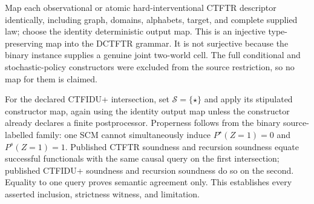 Map each observational or atomic hard-interventional CTFTR descriptor identically, including graph, domains, alphabets, target, and complete supplied law; choose the identity deterministic output map.  This is an injective type-preserving map into the DCTFTR grammar.  It is not surjective because the binary instance supplies a genuine joint two-world cell.  The full conditional and stochastic-policy constructors were excluded from the source restriction, so no map for them is claimed.

For the declared CTFIDU+ intersection, set \(\mathcal S=\{\star\}\) and apply its stipulated constructor map, again using the identity output map unless the constructor already declares a finite postprocessor.  Properness follows from the binary source-labelled family: one SCM cannot simultaneously induce \(P^\star(Z=1)=0\) and \(P^s(Z=1)=1\).  Published CTFTR soundness and recursion soundness equate successful functionals with the same causal query on the first intersection; published CTFIDU+ soundness and recursion soundness do so on the second.  Equality to one query proves semantic agreement only.  This establishes every asserted inclusion, strictness witness, and limitation.